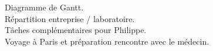 Diagramme de Gantt.\\
Répartition entreprise / laboratoire. \\
Tâches complémentaires pour Philippe. \\
Voyage à Paris et préparation rencontre avec le médecin.

